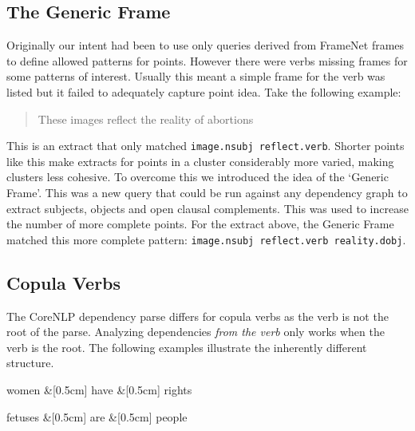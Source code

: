     \tocless\subsection{The Generic Frame}
      Originally our intent had been to use only queries derived from FrameNet frames to define allowed patterns for points. However there were verbs missing frames for some patterns of interest. Usually this meant a simple frame for the verb was listed but it failed to adequately capture point idea. Take the following example:

      \bigskip
      \begin{center}
        \blockquote{These images reflect the reality of abortions}
      \end{center}

      This is an extract that only matched \texttt{image.nsubj reflect.verb}. Shorter points like this make extracts for points in a cluster considerably more varied, making clusters less cohesive. To overcome this we introduced the idea of the `Generic Frame'. This was a new query that could be run against any dependency graph to extract subjects, objects and open clausal complements. This was used to increase the number of more complete points. For the extract above, the Generic Frame matched this more complete pattern: \texttt{image.nsubj reflect.verb reality.dobj}.

    \tocless\subsection{Copula Verbs}
    The CoreNLP dependency parse differs for copula verbs as the verb is not the root of the parse. Analyzing dependencies \textit{from the verb} only works when the verb is the root. The following examples illustrate the inherently different structure.
      \begin{multicols}{2}
        \raggedcolumns
        \begin{center}
          \begin{dependency}[edge horizontal padding=0]
            \begin{deptext}
              women \&[0.5cm] have \&[0.5cm] rights \\
            \end{deptext}
          \end{dependency}
        \end{center}
        \columnbreak
        \begin{center}
          \begin{dependency}[edge horizontal padding=0]
            \begin{deptext}
              fetuses \&[0.5cm] are \&[0.5cm] people \\
            \end{deptext}
          \end{dependency}
        \end{center}
      \end{multicols}

